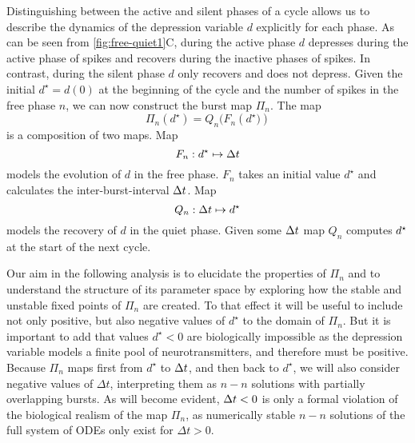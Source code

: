 \documentclass[../manuscript.tex]{subfiles}
\begin{document}
Distinguishing between the active and silent phases of a cycle allows us to describe the dynamics of the depression variable $d$ explicitly for each phase.
As can be seen from \cref{fig:free-quiet1}C, during the active phase $d$ depresses during the active phase of spikes and recovers during the inactive phases of spikes.
In contrast, during the silent phase $d$ only recovers and does not depress.
Given the initial $d^{\star}=d(0)$ at the beginning of the cycle and the number of spikes in the free phase $n$, we can now construct the burst map $\Pi_{n}$.
The map
\begin{equation}
  \Pi_{n}(d^{\star})=Q_{n}\big(F_{n}(d^{\star}\big))
\end{equation}
\noindent
is a composition of two maps.
Map
\begin{equation}
  F_{n}:d^{\star}\mapsto \Delta t
\end{equation}
models the evolution of $d$ in the free phase.
$F_{n}$ takes an initial value $d^{\star}$ and calculates the inter-burst-interval $\Delta t$.
Map
\begin{equation}
  Q_{n}:\Delta t \mapsto d^{\star}
\end{equation}
models the recovery of $d$ in the quiet phase.
Given some $\Delta t$ map $Q_n$ computes $d^\star$ at the start of the next cycle.

Our aim in the following analysis is to elucidate the properties of $\Pi_{n}$ and to understand the structure of its parameter space by exploring how the stable and unstable fixed points of $\Pi_{n}$ are created.
To that effect it will be useful to include not only positive, but also negative values of $d^{\star}$ to the domain of $\Pi_{n}$.
But it is important to add that values $d^{\star}<0$ are biologically impossible as the depression variable models a finite pool of neurotransmitters, and therefore must be positive.
Because $\Pi_{n}$ maps first from $d^{\star}$ to $\Delta t$, and then back to $d^{\star}$, we will also consider negative values of $\Delta t$, interpreting them as $n-n$ solutions with partially overlapping bursts.
As will become evident, $\Delta t<0$ is only a formal violation of the biological realism of the map $\Pi_{n}$, as numerically stable $n-n$ solutions of the full system of ODEs only exist for $\Delta t>0$.
\end{document}
